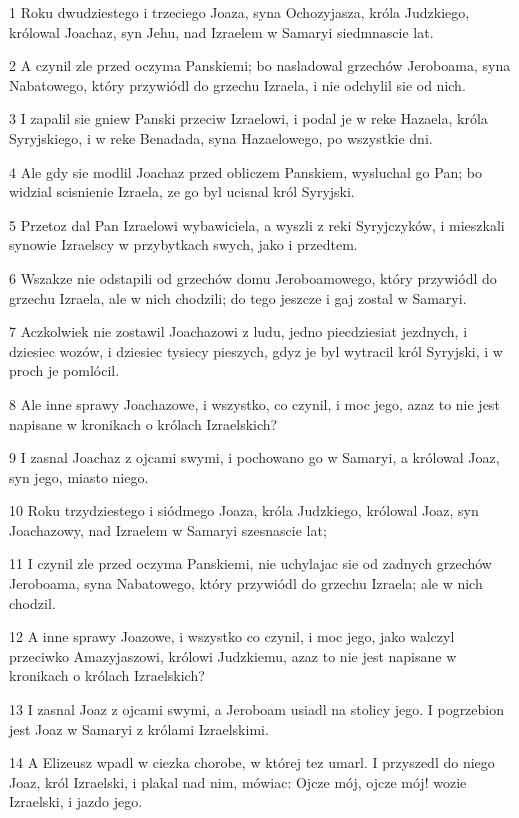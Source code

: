 \par 1 Roku dwudziestego i trzeciego Joaza, syna Ochozyjasza, króla Judzkiego, królowal Joachaz, syn Jehu, nad Izraelem w Samaryi siedmnascie lat.
\par 2 A czynil zle przed oczyma Panskiemi; bo nasladowal grzechów Jeroboama, syna Nabatowego, który przywiódl do grzechu Izraela, i nie odchylil sie od nich.
\par 3 I zapalil sie gniew Panski przeciw Izraelowi, i podal je w reke Hazaela, króla Syryjskiego, i w reke Benadada, syna Hazaelowego, po wszystkie dni.
\par 4 Ale gdy sie modlil Joachaz przed obliczem Panskiem, wysluchal go Pan; bo widzial scisnienie Izraela, ze go byl ucisnal król Syryjski.
\par 5 Przetoz dal Pan Izraelowi wybawiciela, a wyszli z reki Syryjczyków, i mieszkali synowie Izraelscy w przybytkach swych, jako i przedtem.
\par 6 Wszakze nie odstapili od grzechów domu Jeroboamowego, który przywiódl do grzechu Izraela, ale w nich chodzili; do tego jeszcze i gaj zostal w Samaryi.
\par 7 Aczkolwiek nie zostawil Joachazowi z ludu, jedno piecdziesiat jezdnych, i dziesiec wozów, i dziesiec tysiecy pieszych, gdyz je byl wytracil król Syryjski, i w proch je pomlócil.
\par 8 Ale inne sprawy Joachazowe, i wszystko, co czynil, i moc jego, azaz to nie jest napisane w kronikach o królach Izraelskich?
\par 9 I zasnal Joachaz z ojcami swymi, i pochowano go w Samaryi, a królowal Joaz, syn jego, miasto niego.
\par 10 Roku trzydziestego i siódmego Joaza, króla Judzkiego, królowal Joaz, syn Joachazowy, nad Izraelem w Samaryi szesnascie lat;
\par 11 I czynil zle przed oczyma Panskiemi, nie uchylajac sie od zadnych grzechów Jeroboama, syna Nabatowego, który przywiódl do grzechu Izraela; ale w nich chodzil.
\par 12 A inne sprawy Joazowe, i wszystko co czynil, i moc jego, jako walczyl przeciwko Amazyjaszowi, królowi Judzkiemu, azaz to nie jest napisane w kronikach o królach Izraelskich?
\par 13 I zasnal Joaz z ojcami swymi, a Jeroboam usiadl na stolicy jego. I pogrzebion jest Joaz w Samaryi z królami Izraelskimi.
\par 14 A Elizeusz wpadl w ciezka chorobe, w której tez umarl. I przyszedl do niego Joaz, król Izraelski, i plakal nad nim, mówiac: Ojcze mój, ojcze mój! wozie Izraelski, i jazdo jego.
